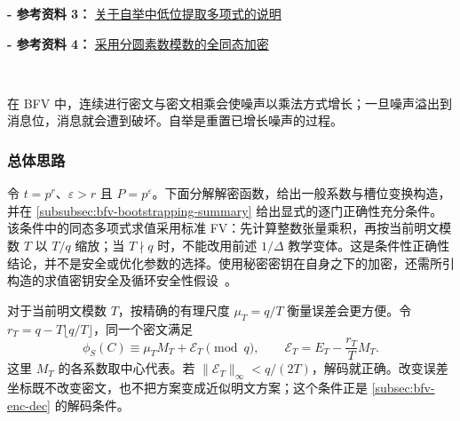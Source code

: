 \noindent \textbf{- 参考资料 3：}
\href{https://arxiv.org/pdf/1906.02867}{关于自举中低位提取多项式的说明}~\cite{huo2019notelowerdigitsextraction}

\noindent \textbf{- 参考资料 4：}
\href{https://eprint.iacr.org/2024/1587.pdf}{采用分圆素数模数的全同态加密}~\cite{cryptoeprint:2024/1587}



$ $

在 BFV 中，连续进行密文与密文相乘会使噪声以乘法方式增长；一旦噪声溢出到消息位，消息就会遭到破坏。自举是重置已增长噪声的过程。

\subsubsection{总体思路}
\label{subsubsec:bfv-bootstrapping-high-level}

令 $t=p^r$、$\varepsilon>r$ 且 $P=p^\varepsilon$。下面分解解密函数，给出一般系数与槽位变换构造，并在 \autoref{subsubsec:bfv-bootstrapping-summary} 给出显式的逐门正确性充分条件。该条件中的同态多项式求值采用标准 FV：先计算整数张量乘积，再按当前明文模数 $T$ 以 $T/q$ 缩放；当 $T\nmid q$ 时，不能改用前述 $1/\Delta$ 教学变体。这是条件性正确性结论，并不是安全或优化参数的选择。使用秘密密钥在自身之下的加密，还需所引构造的求值密钥安全及循环安全性假设~\cite{cryptoeprint:2022/1363}。

对于当前明文模数 $T$，按精确的有理尺度 $\mu_T=q/T$ 衡量误差会更方便。令 $r_T=q-T\lfloor q/T\rfloor$，同一个密文满足
\[
\phi_S(C)\equiv\mu_TM_T+\mathcal E_T\pmod q,
\qquad \mathcal E_T=E_T-\frac{r_T}{T}M_T.
\]
这里 $M_T$ 的各系数取中心代表。若 $\|\mathcal E_T\|_\infty<q/(2T)$，解码就正确。改变误差坐标既不改变密文，也不把方案变成近似明文方案；这个条件正是 \autoref{subsec:bfv-enc-dec} 的解码条件。


